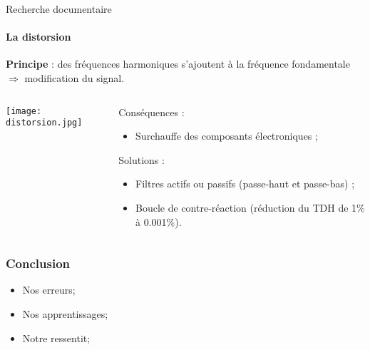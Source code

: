 \documentclass[pdf]{beamer}
\begin{document}
\begin{frame}{Recherche documentaire}
	\framesubtitle{La distorsion}

	\textbf{Principe} : des fréquences harmoniques s'ajoutent à la fréquence fondamentale
	$\Rightarrow$ modification du signal.

	\bigbreak

	\begin{columns}
		\begin{column}{5cm}
			\texttt{[image: distorsion.jpg]}
		\end{column}

		\begin{column}{5cm}
			Conséquences :
			\begin{itemize}
				\item	Surchauffe des composants électroniques ;
			\end{itemize}

			Solutions :
			\begin{itemize}
				\item	Filtres actifs ou passifs (passe-haut et passe-bas) ;
				\item Boucle de contre-réaction (réduction du TDH de 1\% à 0.001\%).
			\end{itemize}
		\end{column}
	\end{columns}
\end{frame}
\begin{frame}
 \frametitle{Conclusion}
 \begin{itemize}
		\item Nos erreurs;
		\item Nos apprentissages;
		\item Notre ressentit;
 \end{itemize}
\end{frame}
\end{document}
